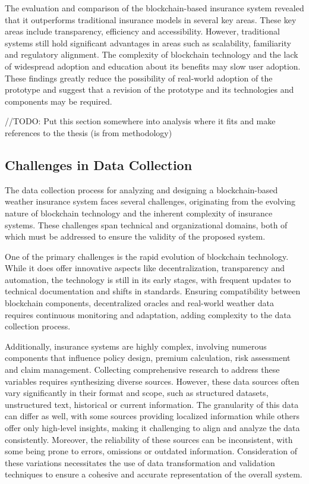 The evaluation and comparison of the blockchain-based insurance system revealed that it outperforms traditional insurance models in several key areas. These key areas include transparency, efficiency and accessibility. However, traditional systems still hold significant advantages in areas such as scalability, familiarity and regulatory alignment. The complexity of blockchain technology and the lack of widespread adoption and education about its benefits may slow user adoption. These findings greatly reduce the possibility of real-world adoption of the prototype and suggest that a revision of the prototype and its technologies and components may be required.



//TODO: Put this section somewhere into analysis where it fits and make references to the thesis (is from methodology)
\subsection{Challenges in Data Collection}
The data collection process for analyzing and designing a blockchain-based weather insurance system faces several challenges, originating from the evolving nature of blockchain technology and the inherent complexity of insurance systems. These challenges span technical and organizational domains, both of which must be addressed to ensure the validity of the proposed system.

One of the primary challenges is the rapid evolution of blockchain technology. While it does offer innovative aspects like decentralization, transparency and automation, the technology is still in its early stages, with frequent updates to technical documentation and shifts in standards. Ensuring compatibility between blockchain components, decentralized oracles and real-world weather data requires continuous monitoring and adaptation, adding complexity to the data collection process.

Additionally, insurance systems are highly complex, involving numerous components that influence policy design, premium calculation, risk assessment and claim management. Collecting comprehensive research to address these variables requires synthesizing diverse sources. However, these data sources often vary significantly in their format and scope, such as structured datasets, unstructured text, historical or current information. The granularity of this data can differ as well, with some sources providing localized information while others offer only high-level insights, making it challenging to align and analyze the data consistently. Moreover, the reliability of these sources can be inconsistent, with some being prone to errors, omissions or outdated information. Consideration of these variations necessitates the use of data transformation and validation techniques to ensure a cohesive and accurate representation of the overall system.

